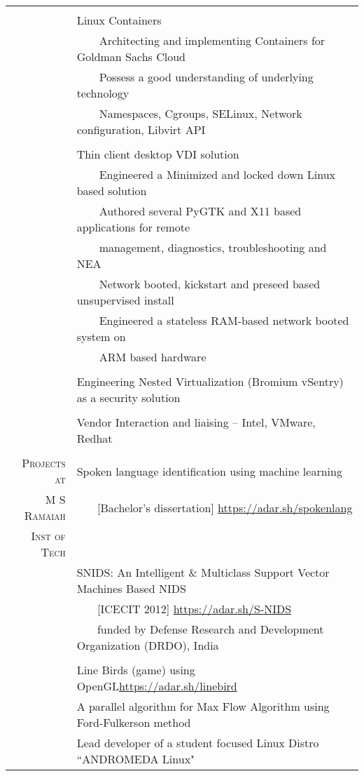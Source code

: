 \documentclass[a4paper,10pt]{article} %
\newcommand{\tabitem}{~~\llap{\textbullet}~~}
\begin{document}
\begin{tabular}{rp{12cm}}
&\\
& Linux Containers\\
& \tabitem Architecting and implementing Containers for Goldman Sachs Cloud \\
& \tabitem Possess a good understanding of underlying technology \\
& ~~~~Namespaces, Cgroups, SELinux, Network configuration, Libvirt API \\
&\\
& Thin client desktop VDI solution\\
& \tabitem Engineered a Minimized and locked down Linux based solution \\
& \tabitem Authored several PyGTK and X11 based applications for remote \\
& ~~~~management, diagnostics, troubleshooting and NEA \\
& \tabitem Network booted, kickstart and preseed based unsupervised install \\
& \tabitem Engineered a stateless RAM-based network booted system on\\ & ~~~~ARM based hardware\\
&\\
& Engineering Nested Virtualization (Bromium vSentry) as a security solution\\
& \\
& Vendor Interaction and liaising – Intel, VMware, Redhat \\
&\\
\textsc{Projects at} & Spoken language identification using machine learning \\ 
\textsc{M S Ramaiah} & ~~~ [Bachelor's dissertation] \qquad \qquad \href{https://adar.sh/spokenlang}{https://adar.sh/spokenlang} \\
\textsc{Inst of Tech} & \\
& SNIDS: An Intelligent \& Multiclass Support Vector Machines Based NIDS \\ 
& ~~~ [ICECIT 2012] \qquad \qquad \qquad \qquad \quad \href{https://adar.sh/S-NIDS}{https://adar.sh/S-NIDS} \\
& ~~~ funded by Defense Research and Development Organization (DRDO), India \\
& \\
& Line Birds (game) using OpenGL\qquad \href{https://adar.sh/linebird}{https://adar.sh/linebird}\\
& A parallel algorithm for Max Flow Algorithm using Ford-Fulkerson method \\
& Lead developer of a student focused Linux Distro ``ANDROMEDA Linux" \\
\end{tabular}
\end{document}

